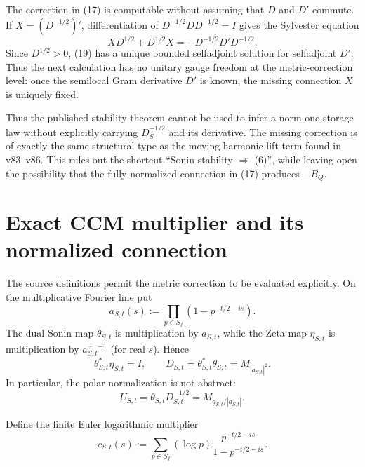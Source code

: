 \documentclass[11pt]{article}
\begin{document}
The correction in (17) is computable without assuming that $D$ and $D'$ commute.
If $X=(D^{-1/2})'$, differentiation of
$D^{-1/2}DD^{-1/2}=I$ gives the Sylvester equation
\begin{equation}
 XD^{1/2}+D^{1/2}X=-D^{-1/2}D'D^{-1/2}.                  \tag{19}
\end{equation}
Since $D^{1/2}>0$, (19) has a unique bounded selfadjoint solution for
selfadjoint $D'$.  Thus the next calculation has no unitary gauge freedom at
the metric-correction level: once the semilocal Gram derivative $D'$ is known,
the missing connection $X$ is uniquely fixed.

Thus the published stability theorem cannot be used to infer a norm-one
storage law without explicitly carrying $D_S^{-1/2}$ and its derivative.
The missing correction is of exactly the same structural type as the moving
harmonic-lift term found in v83--v86.  This rules out the shortcut
``Sonin stability $\Rightarrow$ (6)'', while leaving open the possibility that
the fully normalized connection in (17) produces $-B_Q$.

\section{Exact CCM multiplier and its normalized connection}

The source definitions permit the metric correction to be evaluated
explicitly.  On the multiplicative Fourier line put
\begin{equation}
 a_{S,t}(s):=\prod_{p\in S_f}
 \left(1-p^{-t/2-is}\right).                             \tag{20}
\end{equation}
The dual Sonin map $\theta_{S,t}$ is multiplication by $a_{S,t}$, while the
Zeta map $\eta_{S,t}$ is multiplication by
$\overline{a_{S,t}}^{-1}$ (for real $s$).  Hence
\begin{equation}
 \theta_{S,t}^*\eta_{S,t}=I,
 \qquad
 D_{S,t}=\theta_{S,t}^*\theta_{S,t}=M_{|a_{S,t}|^2}.     \tag{21}
\end{equation}
In particular, the polar normalization is not abstract:
\begin{equation}
 U_{S,t}=\theta_{S,t}D_{S,t}^{-1/2}
 =M_{a_{S,t}/|a_{S,t}|}.                                \tag{22}
\end{equation}

Define the finite Euler logarithmic multiplier
\begin{equation}
 c_{S,t}(s):=\sum_{p\in S_f}(\log p)
 \frac{p^{-t/2-is}}{1-p^{-t/2-is}}.                     \tag{23}
\end{equation}
\end{document}
